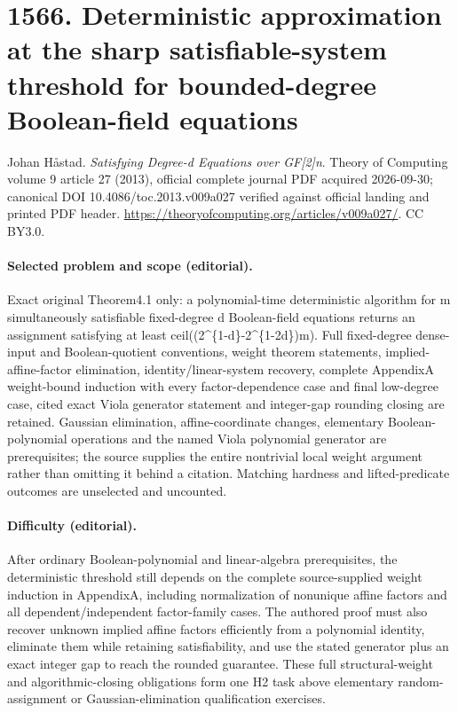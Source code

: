 \documentclass[10pt]{article}
\theoremstyle{definition}
\numberwithin{equation}{section}
\begin{document}
\begingroup\raggedright
\section*{1566. Deterministic approximation at the sharp satisfiable-system threshold for bounded-degree Boolean-field equations}
Johan Håstad. \emph{Satisfying Degree-d Equations over GF[2]n}. Theory of Computing volume 9 article 27 (2013), official complete journal PDF acquired 2026-09-30; canonical DOI 10.4086/toc.2013.v009a027 verified against official landing and printed PDF header. \url{https://theoryofcomputing.org/articles/v009a027/}. CC BY3.0.
\paragraph{Selected problem and scope (editorial).} Exact original Theorem4.1 only: a polynomial-time deterministic algorithm for m simultaneously satisfiable fixed-degree d Boolean-field equations returns an assignment satisfying at least ceil((2\textasciicircum{}\{1-d\}-2\textasciicircum{}\{1-2d\})m). Full fixed-degree dense-input and Boolean-quotient conventions, weight theorem statements, implied-affine-factor elimination, identity/linear-system recovery, complete AppendixA weight-bound induction with every factor-dependence case and final low-degree case, cited exact Viola generator statement and integer-gap rounding closing are retained. Gaussian elimination, affine-coordinate changes, elementary Boolean-polynomial operations and the named Viola polynomial generator are prerequisites; the source supplies the entire nontrivial local weight argument rather than omitting it behind a citation. Matching hardness and lifted-predicate outcomes are unselected and uncounted.
\paragraph{Difficulty (editorial).} After ordinary Boolean-polynomial and linear-algebra prerequisites, the deterministic threshold still depends on the complete source-supplied weight induction in AppendixA, including normalization of nonunique affine factors and all dependent/independent factor-family cases. The authored proof must also recover unknown implied affine factors efficiently from a polynomial identity, eliminate them while retaining satisfiability, and use the stated generator plus an exact integer gap to reach the rounded guarantee. These full structural-weight and algorithmic-closing obligations form one H2 task above elementary random-assignment or Gaussian-elimination qualification exercises.
\end{document}
